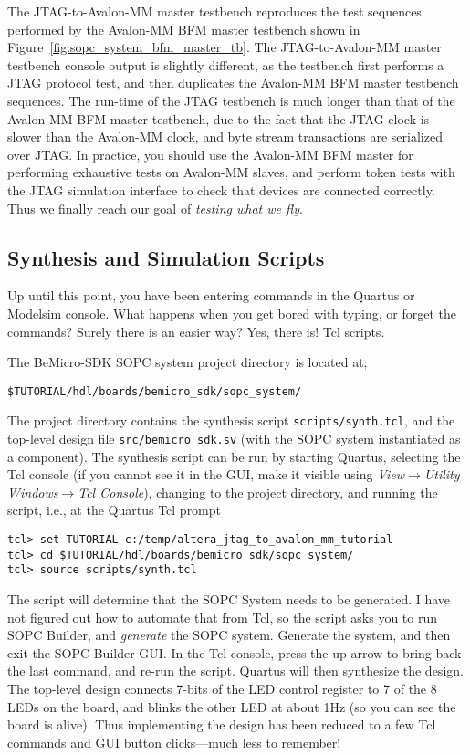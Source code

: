 \documentclass[10pt,twoside]{article}
\begin{document}
%
The JTAG-to-Avalon-MM master testbench reproduces the test sequences 
performed by the Avalon-MM BFM master testbench shown in 
Figure~\ref{fig:sopc_system_bfm_master_tb}. The JTAG-to-Avalon-MM
master testbench console output is slightly different, as the
testbench first performs a JTAG protocol test, and then
duplicates the Avalon-MM BFM master testbench sequences.
The run-time of the JTAG testbench is much longer than that of the 
Avalon-MM BFM master testbench, due to the fact that the JTAG clock
is slower than the Avalon-MM clock, and byte stream transactions 
are serialized over JTAG. In practice, you should use the 
Avalon-MM BFM master for performing exhaustive tests on Avalon-MM 
slaves, and perform token tests with the JTAG simulation interface
to check that devices are connected correctly. Thus we finally 
reach our goal of {\em testing what we fly}.

\clearpage
\subsection{Synthesis and Simulation Scripts}
\label{sec:sopc_system_tcl_scripts}

Up until this point, you have been entering commands
in the Quartus or Modelsim console. What happens when you get bored
with typing, or forget the commands? Surely there is an easier way?
Yes, there is! Tcl scripts.

The BeMicro-SDK SOPC system project directory is located at;
%
\begin{verbatim}
$TUTORIAL/hdl/boards/bemicro_sdk/sopc_system/
\end{verbatim}
%
The project directory contains the synthesis script \verb+scripts/synth.tcl+,
and the top-level design file \verb+src/bemicro_sdk.sv+ (with the
SOPC system instantiated as a component).
The synthesis script can be run by starting Quartus, selecting
the Tcl console (if you cannot see it in the GUI, make it visible
using {\em View}$\rightarrow${\em Utility Windows}$\rightarrow${\em Tcl Console}),
changing to the project directory, and running the script, i.e.,
at the Quartus Tcl prompt
%
\begin{verbatim}
tcl> set TUTORIAL c:/temp/altera_jtag_to_avalon_mm_tutorial
tcl> cd $TUTORIAL/hdl/boards/bemicro_sdk/sopc_system/
tcl> source scripts/synth.tcl
\end{verbatim}
%
The script will determine that the SOPC System needs to be
generated. I have not figured out how to automate that from Tcl,
so the script asks you to run SOPC Builder, and {\em generate}
the SOPC system. Generate the system, and then exit the SOPC Builder GUI.
In the Tcl console, press the up-arrow to bring back the last 
command, and re-run the script. Quartus will then synthesize the
design. The top-level design connects 7-bits of the LED control
register to 7 of the 8 LEDs on the board, and blinks the other
LED at about 1Hz (so you can see the board is alive).
Thus implementing the design has been reduced to a few
Tcl commands and GUI button clicks---much less to remember!
\end{document}
